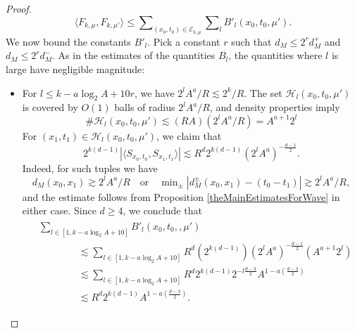 \begin{proof}
\begin{equation}
    \langle F_{k,\mu}, F_{k,\mu'} \rangle \leq \sum\nolimits_{(x_0,t_0) \in \mathcal{E}_{k,\mu}} \sum\nolimits_l B'_l(x_0,t_0,\mu').
\end{equation}
%
We now bound the constants $B'_l$. Pick a constant $r$ such that $d_M \leq 2^r d_M^+$ and $d_M \leq 2^r d_M^-$. As in the estimates of the quantities $B_l$, the quantities where $l$ is large have negligible magnitude:
%
\begin{itemize}
    \item For $l \leq k - a \log_2 A + 10 r$, we have $2^l A^a / R \lesssim 2^k / R$. The set $\mathcal{H}_l(x_0,t_0,\mu')$ is covered by $O(1)$ balls of radius $2^l A^a / R$, and density properties imply
    \begin{equation}
        \# \mathcal{H}_l(x_0,t_0,\mu') \lesssim (R A) (2^l A^a / R) = A^{a+1} 2^l
    \end{equation}
    For $(x_1,t_1) \in \mathcal{H}_l(x_0,t_0,\mu')$, we claim that
    \begin{equation}
        2^{k(d-1)} |\langle {S\!}_{x_0,t_0}, {S\!}_{x_1,t_1} \rangle| \lesssim R^{d} 2^{k(d-1)} (2^l A^a)^{- \frac{d-1}{2}}.
    \end{equation}
    Indeed, for such tuples we have
    \begin{equation}
        d_M(x_0,x_1) \gtrsim 2^l A^a / R \quad\text{or}\quad \min\nolimits_{\pm} |d_M^{\pm}(x_0,x_1) - (t_0 - t_1)| \gtrsim 2^l A^a / R,
    \end{equation}
    and the estimate follows from Proposition \ref{theMainEstimatesForWave} in either case. Since $d \geq 4$, we conclude that
    \begin{align} \label{BBBEquation}
    \begin{split}
        &\sum\nolimits_{l \in [1, k - a \log_2 A + 10]} B'_l(x_0,t_0,,\mu')\\
        &\quad\quad\quad\quad \lesssim \sum\nolimits_{l \in [1, k - a \log_2 A + 10]} R^{d} (2^{k(d-1)}) (2^l A^a)^{- \frac{d-1}{2}} (A^{a+1} 2^l)\\
        &\quad\quad\quad\quad \lesssim \sum\nolimits_{l \in [1, k - a \log_2 A + 10]} R^{d}  2^{k(d-1)} 2^{-l \frac{d-3}{2}} A^{1 - a \left( \frac{d-3}{2} \right)}\\
        &\quad\quad\quad\quad \lesssim R^{d} 2^{k(d-1)} A^{1 - a \left( \frac{d-3}{2} \right)}.
    \end{split}
    \end{align}


\end{itemize}
\end{proof}
